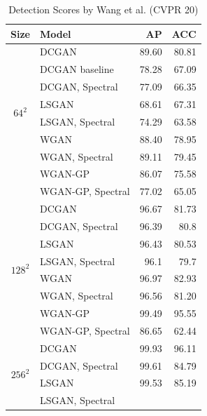 \documentclass[letterpaper]{article} %
\begin{document}
\begin{table}
    \caption{Detection Scores by Wang et al. (CVPR 20)}
    \centering
    \begin{tabular}{l|l|rr}
        \toprule
        Size & Model & AP&ACC\\
        \midrule
        
\multicolumn{1}{c|}{\multirow{8}{*}{$64^2$}} 
& DCGAN & 89.60&80.81 \\
& DCGAN baseline &78.28&67.09\\
  & DCGAN, Spectral &77.09&66.35\\ 
 \cline{2-4}
 & LSGAN &68.61&67.31 \\
 & LSGAN, Spectral &74.29&63.58 \\ %
 & WGAN & 88.40&78.95\\
 & WGAN, Spectral &  89.11&79.45\\ \cline{2-4}
 & WGAN-GP & 86.07&75.58\\
 & WGAN-GP, Spectral&77.02&65.05\\ \midrule
\multicolumn{1}{c|}{\multirow{8}{*}{$128^2$}} & DCGAN &96.67&81.73\\
 & DCGAN, Spectral & 96.39&80.8\\ \cline{2-4}
 & LSGAN & 96.43&80.53 \\
 & LSGAN, Spectral &96.1&79.7  \\ \cline{2-4}
 & WGAN &96.97&82.93  \\
 & WGAN, Spectral& 96.56&81.20\\ \cline{2-4}
 & WGAN-GP &99.49&95.55  \\ 
 & WGAN-GP, Spectral &86.65&62.44 \\\midrule
\multicolumn{1}{c|}{\multirow{4}{*}{$256^2$}} & DCGAN &99.93& 96.11\\
 & DCGAN, Spectral &99.61&84.79\\ \cline{2-4}
 & LSGAN & 99.53&85.19 \\
 & LSGAN, Spectral &  \\ \bottomrule

    \end{tabular}
\end{table}
\fi
\end{document}

